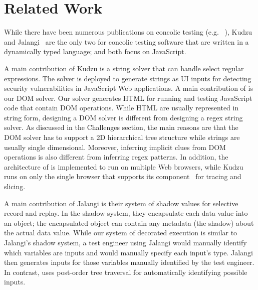 \section{Related Work}


While there have been numerous publications on concolic testing (e.g. ~\cite{cute, klee, feedbackConcolic, eventConcolic}), Kudzu~\cite{kudzu} and Jalangi~\cite{jalangi} are the only two for concolic testing software that are written in a dynamically typed language; and both focus on JavaScript.  

A main contribution of Kudzu is a string solver that can handle select regular expressions.  The solver is deployed to generate strings as UI inputs for detecting security vulnerabilities in JavaScript Web applications.   
A main contribution of \tool is our DOM solver.  Our solver generates HTML for running and testing JavaScript code that contain DOM operations.    
While HTML are usually represented in string form, designing a DOM solver is different from designing a regex string solver.
As discussed in the Challenges section, the main reasons are that the DOM solver has to support a 2D hierarchical tree structure while strings are usually single dimensional.  
Moreover, inferring implicit clues from DOM operations is also different from inferring regex patterns.  
In addition, the architecture of \tool is implemented to run on multiple Web browsers, while Kudzu runs on only the single browser that supports its component~\cite{flax} for tracing and slicing.    

A main contribution of Jalangi is their system of shadow values for selective record and replay.  In the shadow system, they encapsulate each data value into an object; the encapsulated object can contain any metadata (the shadow) about the actual data value.  
While our system of decorated execution is similar to Jalangi's shadow system, a test engineer using Jalangi would manually identify which variables are inputs and would manually specify each input's type.  
Jalangi then generates inputs for those variables manually identified by the test engineer.  In contrast, \tool uses post-order tree traversal for automatically identifying possible inputs.  

